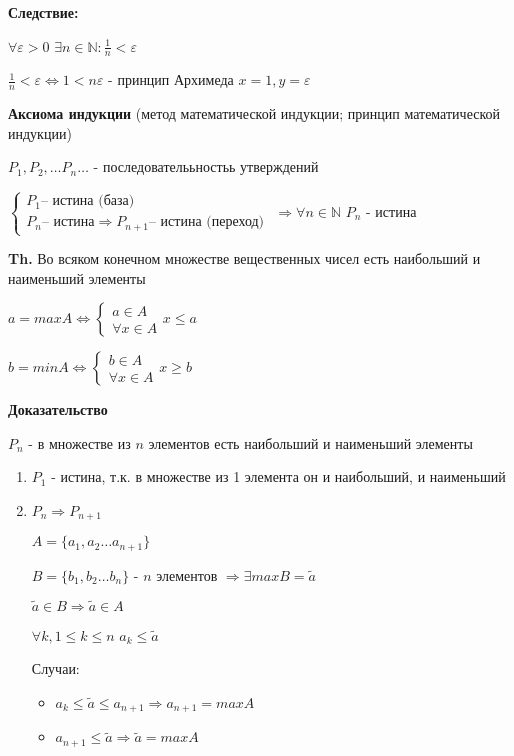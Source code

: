 \documentclass[14pt, letter paper]{article}
\begin{document}
\textbf{Следствие:}

$\forall \varepsilon > 0$ $\exists n \in \mathds{N}: \frac{1}{n} < \varepsilon$

$\frac{1}{n} < \varepsilon \Leftrightarrow 1 < n \varepsilon$ - принцип Архимеда $x = 1, y = \varepsilon$

\textbf{Аксиома индукции} (метод математической индукции; принцип математической индукции)

$P_1, P_2, \ldots P_n \ldots$ - последователььностьь утверждений

$\begin{cases}
P_1 \text{-- истина (база)} \\
P_n \text{-- истина} \Rightarrow P_{n+1} \text{-- истина (переход)}
\end{cases}$
$\Rightarrow \forall n \in \mathds{N}$ $P_n$ - истина

\textbf{Th.} Во всяком конечном множестве вещественных чисел есть наибольший и наименьший элементы

$a = maxA \Leftrightarrow \begin{cases} a \in A \\ \forall x \in A \end{cases} x \leq a$

$b = minA \Leftrightarrow \begin{cases} b \in A \\ \forall x \in A \end{cases} x \geq b$

\begin{center}
    \textbf{Доказательство}
\end{center}

$P_n$ - в множестве из $n$ элементов есть наибольший и наименьший элементы

\begin{enumerate}
    \item $P_1$ - истина, т.к. в множестве из 1 элемента он и наибольший, и наименьший
    \item $P_n \Rightarrow P_{n+1}$

    $A = \{ a_1, a_2 \ldots a_{n+1} \}$

    $B = \{ b_1, b_2 \ldots b_n \}$ - $n$ элементов $\Rightarrow \exists maxB = \tilde{a}$

    $\tilde{a} \in B \Rightarrow \tilde{a} \in A$

    $\forall k, 1 \leq k \leq n$ $a_k \leq \tilde{a}$

    Случаи:
    \begin{itemize}
        \item $a_k \leq \tilde{a} \leq a_{n+1} \Rightarrow a_{n+1} = maxA$
        \item $a_{n+1} \leq \tilde{a} \Rightarrow \tilde{a} = maxA$
    \end{itemize}
\end{enumerate}
\end{document}
